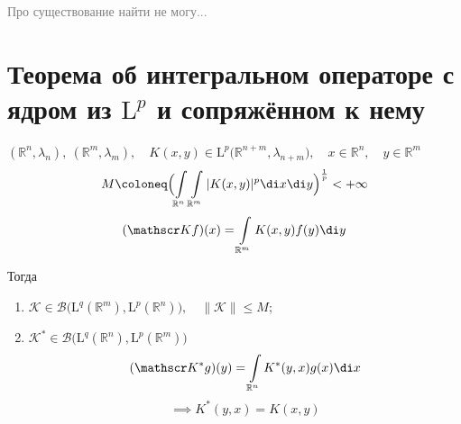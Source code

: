 \textcolor{gray}{Про существование найти не могу...}

\section{Теорема об интегральном операторе с ядром из
\texorpdfstring{$ \mathrm L^p $}{пространства Лебега} и сопряжённом к нему}

\begin{theorem}
	$ (\mathbb R^n, \lambda_n), ~ (\mathbb R^m, \lambda_m), \quad
	K(x, y) \in \mathrm L^p \bigl(\mathbb R^{n + m}, \lambda_{n + m} \bigr), \quad
	x \in \mathbb R^n, \quad y \in \mathbb R^m $
	$$ M \coloneq \Bigl( \int\limits_{\mathbb R^n} \int\limits_{\mathbb R^m}
	|K(x, y)|^p \di x \di y \Bigr)^{\frac1p} < +\infty $$
	$$ (\mathscr K f)(x) = \int\limits_{\mathbb R^m} K(x, y) f(y) \di y $$

	Тогда
	\begin{enumerate}
		\item $ \mathscr K \in
			\mathscr B \bigl( \mathrm L^q(\mathbb R^m), \mathrm L^p(\mathbb R^n) \bigr), \quad
			\|\mathscr K\| \le M $;
		\item $ \mathscr K^* \in
			\mathscr B \bigl( \mathrm L^q(\mathbb R^n), \mathrm L^p(\mathbb R^m) \bigr) $
			$$ (\mathscr K^* g)(y) = \int\limits_{\mathbb R^n} K^*(y, x) g(x) \di x $$
			$$ \implies K^*(y, x) = K(x, y) $$
	\end{enumerate}
\end{theorem}

